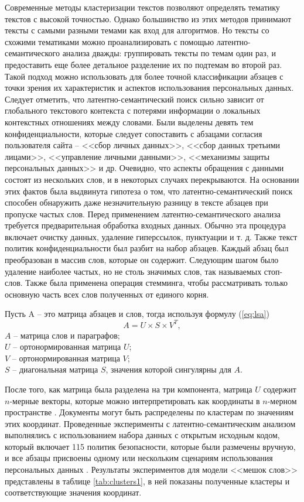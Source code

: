 \documentclass[../main]{subfiles}
\begin{document}
Современные методы кластеризации текстов позволяют определять тематику текстов с высокой точностью. Однако большинство из этих методов принимают тексты с самыми разными темами как вход для алгоритмов. Но тексты со схожими тематиками можно проанализировать с помощью ла\-тен\-тно-семантического анализа дважды: группировать тексты по темам один раз, и предоставить еще более детальное разделение их по подтемам во второй раз. Такой подход можно использовать для более точной классификации абзацев с точки зрения их характеристик и аспектов использования персональных данных. Следует отметить, что латентно-семантический поиск сильно зависит от глобального текстового контекста с потерями информации о локальных контекстных отношениях между словами. Были выделены девять тем конфиденциальности, которые следует сопоставить с абзацами согласия пользователя сайта -- <<сбор личных данных>>, <<сбор данных третьими лицами>>, <<управление личными данными>>, <<механизмы защиты персональных данных>> и др. Очевидно, что аспекты обращения с данными состоят из нескольких слов, и в некоторых случаях перекрываются. На основании этих фактов была выдвинута гипотеза о том, что латентно-семантический поиск способен обнаружить даже незначительную разницу в тексте абзацев при пропуске частых слов. Перед применением латентно-семантического анализа требуется предварительная обработка входных данных. Обычно эта процедура включает очистку данных, удаление гиперссылок, пунктуации и т. д. Также текст политик конфиденциальности был разбит на набор абзацев. Каждый абзац был преобразован в массив слов, которые он содержит. Следующим шагом было удаление наиболее частых, но не столь значимых слов, так называемых стоп-слов. Также была применена операция стемминга, чтобы рассматривать только основную часть всех слов полученных от единого корня.

Пусть A -- это матрица абзацев и слов, тогда используя формулу (\ref{eq:lsa})
\begin{equation}
    \label{eq:lsa}
    A = U \times S \times V^T,
\end{equation}
$A$ -- матрица слов и параграфов;\\
\makebox[1.25cm]{\hfill}$U$ -- ортонормированная матрица $U$;\\
\makebox[1.25cm]{\hfill}$V$ -- ортонормированная матрица $V$;\\
\makebox[1.25cm]{\hfill}$S$ -- диагональная матрица $S$, значения которой сингулярны для $A$.

После того, как матрица была разделена на три компонента, матрица $U$ содержит $n$-мерные векторы, которые можно интерпретировать как координаты в $n$-мерном пространстве \cite{LSA}. Документы могут быть распределены по кластерам по значениям этих координат. Проведенные эксперименты с латентно-семантическим анализом выполнялись с использованием набора данных с открытым исходным кодом, который включает 115 политик безопасности, которые были размечены вручную, и все абзацы присвоены одному или нескольким сценариям использования персональных данных \cite{MDPI18}. Результаты экспериментов для модели <<мешок слов>> представлены в таблице \ref{tab:clusters1}, в ней показаны полученные кластеры и соответствующие значения координат.
\end{document}
